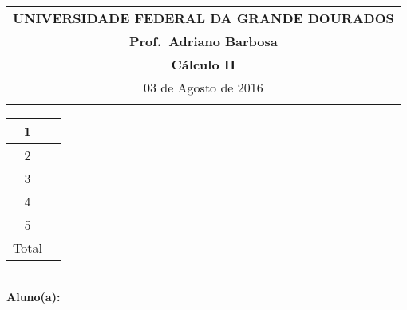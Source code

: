 \documentclass[a4paper,5pt]{amsbook}
\begin{document}
\thispagestyle{empty}
\begin{minipage}[b]{0.45\linewidth}
\begin{tabular}{c}
\toprule{}
{{\bf UNIVERSIDADE FEDERAL DA GRANDE DOURADOS}}\\
{{\bf Prof.\ Adriano Barbosa}}\\



{{\bf C\'alculo II}}\\

\midrule{}
\hspace{8cm}03 de Agosto de 2016  \\
\bottomrule{}
\end{tabular}
%
\end{minipage} \hfill
\begin{minipage}[b]{0.58\linewidth}
\begin{flushright}
\def\arraystretch{1.2}
\begin{tabular}{|c|c|}
\hline\hline
1 & \hspace{1.2cm} \\
\hline
2& \\
\hline
3& \\
\hline
4&  \\
\hline
5&  \\
\hline
{\small Total}&  \\
\hline\hline
\end{tabular}
\end{flushright}
\end{minipage} \hfill
\vspace{0.3cm}\\
{\bf Aluno(a):}\dotfill{} \\
\end{document}
